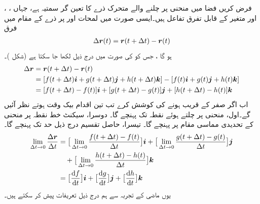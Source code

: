 فرض کریں فضا میں  منحنی پر چلنے والے  متحرک  ذرے  کا    تعین گر سمتیہ  ہے، جہاں ،  ، اور  متغیر  کے قابل تفرق تفاعل ہیں۔ایسی  صورت میں لمحات   اور   پر   ذرے کے مقام  میں فرق 
\begin{align*}
\Delta {\ensuremath{{\boldsymbol{r}}}}(t)={{\boldsymbol{r}}}(t+\Delta t)-{{\boldsymbol{r}}}(t)
\end{align*}
ہو گا ، جس کو  کی صورت میں درج ذیل لکھا جا سکتا ہے (شکل )۔
\begin{align*}
\Delta {\ensuremath{{\boldsymbol{r}}}}&={{\boldsymbol{r}}}(t+\Delta t)-{{\boldsymbol{r}}}(t)\\
&=[f(t+\Delta t){\boldsymbol{i}}+g(t+\Delta t){\boldsymbol{j}}+h(t+\Delta t){\boldsymbol{k}}]-[f(t){\boldsymbol{i}}+g(t){\boldsymbol{j}}+h(t){\boldsymbol{k}}]\\
&=[f(t+\Delta t)-f(t)]{\boldsymbol{i}}+[g(t+\Delta t)-g(t)]{\boldsymbol{j}}+[h(t+\Delta t)-h(t)]{\boldsymbol{k}}
\end{align*}
اب اگر  صفر کے قریب  ہونے کی کوشش کرے تب تین  اقدام بیک وقت ہوتے نظر آئیں گے۔اول،  منحنی پر چلتے ہوئے  نقطہ  تک پہنچے گا۔ دوسرا،  سیکنٹ خط   نقطہ  پر منحنی کے تحدیدی   مماسی مقام پر پہنچے گا۔ تیسرا، حاصل تقسیم  درج ذیل حد  تک پہنچے گا۔
\begin{align*}
\lim_{\Delta t\to 0}\frac{\Delta \kvec{r}}{\Delta t}&=\big[\lim_{\Delta t\to 0}\frac{f(t+\Delta t)-f(t)}{\Delta t}\big]\ai+\big[\lim_{\Delta t\to 0}\frac{g(t+\Delta t)-g(t)}{\Delta t}\big]\aj\\
&\quad +\big[\lim_{\Delta t\to 0}\frac{h(t+\Delta t)-h(t)}{\Delta t}\big]\ak\\
&=\big[\frac{\dif f}{\dif t}\big]\ai+\big[\frac{\dif g}{\dif t}\big]\aj+\big[\frac{\dif h}{\dif t}\big]\ak
\end{align*}
یوں ماضی  کے تجربہ سے ہم درج ذیل تعریفات پیش کر سکتے ہیں۔
